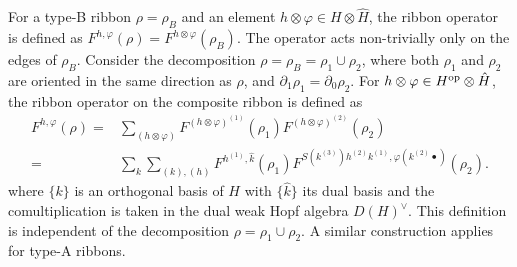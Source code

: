 \documentclass[a4paper,11pt]{article}
\theoremstyle{theorem}
\theoremstyle{remark}
\begin{document}
For a type-B ribbon $\rho = \rho_B$ and an element $h \otimes \varphi \in H \otimes \hat{H}$, the ribbon operator is defined as $F^{h,\varphi}(\rho) = F^{h \otimes \varphi}(\rho_B)$. The operator acts non-trivially only on the edges of $\rho_B$. Consider the decomposition $\rho = \rho_B = \rho_1 \cup \rho_2$, where both $\rho_1$ and $\rho_2$ are oriented in the same direction as $\rho$, and $\partial_1 \rho_1 = \partial_0 \rho_2$. For $h \otimes \varphi \in H^{\rm op} \otimes \hat{H}$, the ribbon operator on the composite ribbon is defined as
\begin{equation}
\begin{aligned}
    F^{h,\varphi}(\rho) = &\sum_{(h \otimes \varphi)} F^{(h \otimes \varphi)^{(1)}}(\rho_1) F^{(h \otimes \varphi)^{(2)}}(\rho_2) \\
= & \sum_k \sum_{(k), (h)} F^{h^{(1)}, \hat{k}}(\rho_1) F^{S(k^{(3)}) h^{(2)} k^{(1)}, \varphi(k^{(2)} \bullet)}(\rho_2).
\end{aligned}
\end{equation}
 where $\{k\}$ is an orthogonal basis of $H$ with $\{\hat{k}\}$ its dual basis and the comultiplication is taken in the dual weak Hopf algebra $D(H)^{\vee}$.
This definition is independent of the decomposition $\rho = \rho_1 \cup \rho_2$. A similar construction applies for type-A ribbons.
\end{document}
